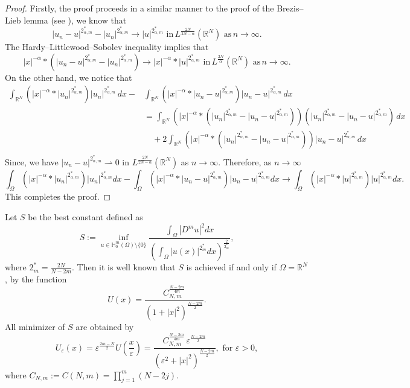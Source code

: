 \documentclass[reqno]{amsart}
\newcommand{\eps}{\varepsilon}
\newcommand{\Om}{\Omega}
\newcommand{\weak}{\rightharpoonup}
\newcommand{\al} {\alpha}
\newcommand{\noi} {  \noindent}
\newcommand{\mb} {\mathbb}
\numberwithin{theorem}{section} \numberwithin{equation}{section}
\begin{document}
\begin{proof}
Firstly, the proof proceeds in a  similar manner to the proof of the Brezis--Lieb lemma (see \cite{37article}), we know that
\[
|u_n - u|^{2_{\al, m}^*} - |u_n|^{2_{\al, m}^*} \to |u|^{2_{\al, m}^*}
\text{ in}  \, L^{\frac{2N}{2N-\al}}(\mb{R}^N) \text{ as} \,  n \to \infty.\]
 The Hardy--Littlewood--Sobolev inequality implies that
\[
|x|^{-\al} * \left(|u_n - u|^{2_{\al, m}^*} - |u_n|^{2_{\al, m}^*}\right)
\to
|x|^{-\al} * |u|^{2_{\al, m}^*}
\text{ in}  \, L^{\frac{2N}{\al}}(\mb{R}^N) \text{ as} \,  n \to \infty.\]
On the other hand, we notice that 
\begin{align*}
\int_{\mb{R}^N}
\left(|x|^{-\al} * |u_n|^{2_{\al, m}^*}\right)|u_n|^{2_{\al, m}^*}\,dx
-
&\int_{\mb{R}^N}
\left(|x|^{-\al} * |u_n-u|^{2_{\al, m}^*}\right)|u_n-u|^{2_{\al, m}^*}\,dx \\
&=
\int_{\mb{R}^N}
\left(|x|^{-\al} *
\left(|u_n|^{2_{\al, m}^*}-|u_n-u|^{2_{\al, m}^*}\right)\right)
\left(|u_n|^{2_{\al, m}^*}-|u_n-u|^{2_{\al, m}^*}\right)\,dx \\
&\quad
+2\int_{\mb{R}^N}
\left(|x|^{-\al} *
\left(|u_n|^{2_{\al, m}^*}-|u_n-u|^{2_{\al, m}^*}\right)\right)
|u_n-u|^{2_{\al, m}^*}\,dx \\
\end{align*}
Since, we have
$|u_n-u|^{2_{\al, m}^*} \weak 0$
in $L^{\frac{2N}{2N-\al}}(\mb{R}^N)$ as $n \to \infty$.
Therefore, as $n\to\infty$
\[\int_{\Om}(|x|^{-\al}*|u_n|^{2_{\al, m}^*})|u_n|^{2_{\al, m}^*} dx- \int_\Om(|x|^{-\al}*|u_n -u|^{2_{\al, m}^*})|u_n-u|^{2_{\al, m}^*} dx \to \int_\Om(|x|^{-\al}*|u|^{{2_{\al, m}^*}})|u|^{2_{\al, m}^*} dx.\]
This completes the proof.
\end{proof}

\vspace{0.02cm}
\noi Let $S$ be the best constant defined as
\[S := \inf_{u \in\mb{H}_0^m(\Om) \setminus \{0\}} \frac{\int_\Om|D^m u|^2 dx}{\left( \int_\Om |u(x)|^{2_m^*} dx \right)^\frac{2}{2_m^*}},\]
where $2_m^* = \frac{2N}{N-2m}$. Then it is well known that $S$ is achieved if and only if $\Om = \mb{R}^N$, by the function \cite{26swanson1992best}
\[U(x) = \frac{C_{N,m}^\frac{N-2m}{4m}}{\left(1+|x|^2\right)^{\frac{N-2m}{2}}}.\]
All minimizer of $S$ are obtained by
\begin{equation} \label{e57}
U_{\eps}(x) = \eps^ \frac{2m-N}{2}U\left( \frac{x}{\eps} \right) = \frac{C_{N, m}^{\frac{N-2m}{4m}} \, \eps^{\frac{N - 2m}{2}}}{\left( \eps^2 + |x|^2 \right)^{\frac{N - 2m}{2}}},  \text{ for } \eps > 0, \end{equation} 
where $C_{N, m}:=C(N, m) = \prod_{j=1}^m (N-2j)$.\\
\end{document}
